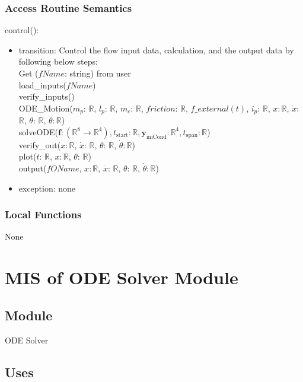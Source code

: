\documentclass[12pt, titlepage]{article}
\begin{document}
\subsubsection{Access Routine Semantics}

\noindent control():
\begin{itemize}
\item transition: Control the flow input data, calculation, and the output data by following below steps: \\
\noindent Get ($fName$: string) from user\\
\noindent load\_inputs($fName$)\\
\noindent verify\_inputs()\\
\noindent ODE\_Motion($ m_p$: $\mathbb{R}$, $l_p$: $\mathbb{R}$, $m_c$: $\mathbb{R}$, $friction$: $\mathbb{R}$, $f\_external(t)$, $i_p$: $\mathbb{R}$, $x$$: \mathbb{R}$, $\dot{x}$: $\mathbb{R}$, $\theta$: $\mathbb{R}$, $\dot{\theta}$$: \mathbb{R}$)\\
\noindent solveODE($\textbf{f}: (\mathbb{R}^{8} \rightarrow \mathbb{R}^4),  t_\text{start}: \mathbb{R}, \textbf{y}_\text{iniCond}: \mathbb{R}^4, t_\text{span}: \mathbb{R}$)\\
\noindent verify\_out($x$$: \mathbb{R}$, $\dot{x}$: $\mathbb{R}$, $\theta$: $\mathbb{R}$, $\dot{\theta}$$: \mathbb{R}$)\\
\noindent plot($t$: $\mathbb{R}$, $x$$: \mathbb{R}$, $\theta$: $\mathbb{R}$)\\
\noindent output($fOName$, $x$$: \mathbb{R}$, $\dot{x}$: $\mathbb{R}$, $\theta$: $\mathbb{R}$, $\dot{\theta}$$: \mathbb{R}$)\\
\item exception: none
\end{itemize}

\subsubsection{Local Functions}
None


\newpage

\section{MIS of ODE Solver Module \label{MODE}}

\subsection{Module}
ODE Solver
\subsection{Uses}
\end{document}
